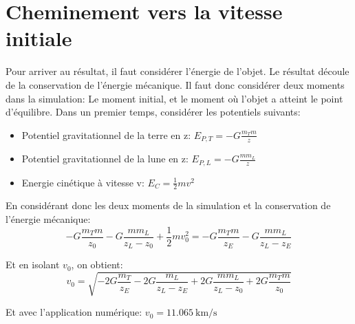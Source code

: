 \documentclass[a4paper,12pt,twoside]{article}
\begin{document}
\section{Cheminement vers la vitesse initiale}
Pour arriver au résultat, il faut considérer l'énergie de l'objet.
Le résultat découle de la conservation de l'énergie mécanique.
Il faut donc considérer deux moments dans la simulation: Le moment initial, et le moment où l'objet a atteint le point d'équilibre.
Dans un premier temps, considérer les potentiels suivants:
\begin{itemize}
	\item Potentiel gravitationnel de la terre en z: $E_{P,T} = -G\frac{m_T m}{z}$
	\item Potentiel gravitationnel de la lune en z: $E_{P,L} = -G\frac{m m_L}{z}$
	\item Energie cinétique à vitesse v: $E_C = \frac{1}{2}mv^2$
\end{itemize}

En considérant donc les deux moments de la simulation et la conservation de l'énergie mécanique:
\begin{equation}
	-G\frac{m_T m}{z_0} - G\frac{m m_L}{z_L - z_0} + \frac{1}{2}mv_0^2 = -G\frac{m_T m}{z_E} - G\frac{m m_L}{z_L - z_E}
\end{equation}

Et en isolant $v_0$, on obtient:
\begin{equation}
v_0 = \sqrt{-2G\frac{m_T}{z_E} - 2G\frac{m_L}{z_L - z_E} + 2G\frac{m m_L}{z_L - z_0} + 2G\frac{m_T m}{z_0}}
\end{equation}

Et avec l'application numérique: $v_0 = \SI{11.065}{\kilo\meter\per\second}$
\end{document}
